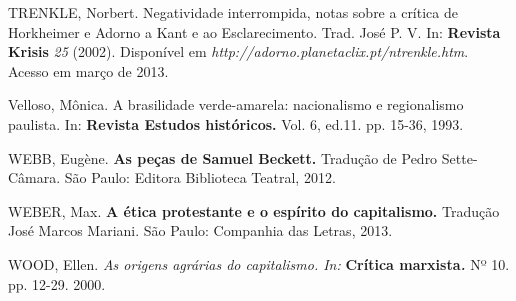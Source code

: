 TRENKLE, Norbert. Negatividade interrompida, notas sobre a crítica de
Horkheimer e Adorno a Kant e ao Esclarecimento. Trad. José P. V. In:
\textbf{Revista Krisis} \emph{25} (2002). Disponível em
\emph{http://adorno.planetaclix.pt/ntrenkle.htm}.
Acesso em março de 2013.

Velloso, Mônica. A brasilidade verde-amarela: nacionalismo e
regionalismo paulista. In: \textbf{Revista Estudos históricos.} Vol. 6,
ed.11. pp. 15-36, 1993.

WEBB, Eugène. \textbf{As peças de Samuel Beckett.} Tradução de Pedro
Sette-Câmara. São Paulo: Editora Biblioteca Teatral, 2012.

WEBER, Max. \textbf{A ética protestante e o espírito do capitalismo.}
Tradução José Marcos Mariani. São Paulo: Companhia das Letras, 2013.

WOOD, Ellen. \emph{As origens agrárias do capitalismo. In:}
\textbf{Crítica marxista\emph{. }}Nº 10. pp. 12-29. 2000.
